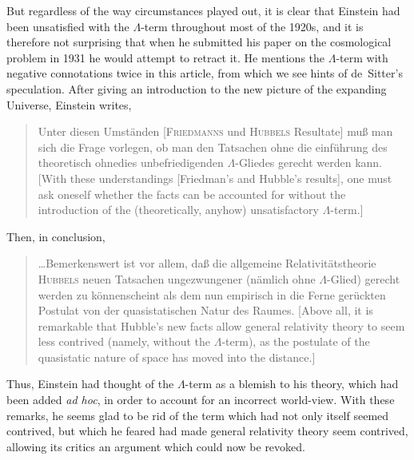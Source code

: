 But regardless of the way circumstances played out, it is clear that Einstein had been unsatisfied with the $\Lambda$-term throughout most of the 1920s, and it is therefore not surprising that when he submitted his paper on the cosmological problem in 1931 \cite{Einstein1931} he would attempt to retract it. He mentions the $\Lambda$-term with negative connotations twice in this article, from which we see hints of de~Sitter's speculation. After giving an introduction to the new picture of the expanding Universe, Einstein writes,
\begin{quotation}
Unter diesen Umst\"{a}nden [\textsc{Friedmanns} und \textsc{Hubbels} Resultate] mu{\ss} man sich die Frage vorlegen, ob man den Tatsachen ohne die einf\"{u}hrung des theoretisch ohnedies unbefriedigenden $\Lambda$-Gliedes gerecht werden kann. [With these understandings [Friedman's and Hubble's results], one must ask oneself whether the facts can be accounted for without the introduction of the (theoretically, anyhow) unsatisfactory $\Lambda$-term.]
\end{quotation}
Then, in conclusion,
\begin{quote}
\ldots Bemerkenswert ist vor allem, da{\ss} die allgemeine Relativit\"{a}tstheorie \textsc{Hubbels} neuen Tatsachen ungezwungener (n\"{a}mlich ohne $\Lambda$-Glied) gerecht werden zu k\"{o}nnenscheint als dem nun empirisch in die Ferne ger\"{u}ckten Postulat von der quasistatischen Natur des Raumes. [Above all, it is remarkable that Hubble's new facts allow general relativity theory to seem less contrived (namely, without the $\Lambda$-term), as the postulate of the quasistatic nature of space has moved into the distance.] 
\end{quote} 
Thus, Einstein had thought of the $\Lambda$-term as a blemish to his theory, which had been added \textit{ad hoc}, in order to account for an incorrect world-view. With these remarks, he seems glad to be rid of the term which had not only itself seemed contrived, but which he feared had made general relativity theory seem contrived, allowing its critics an argument which could now be revoked.

